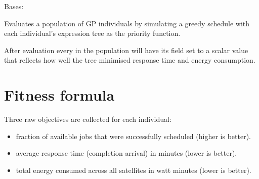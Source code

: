 \documentclass[letterpaper,10pt,english]{sphinxmanual}
\begin{document}

\begin{fulllineitems}
\label{\detokenize{api:scheduler.FitnessEvaluator}}
\pysigstartsignatures
\pysigline
{}
\pysigstopsignatures
\sphinxAtStartPar
Bases: 

\sphinxAtStartPar
Evaluates a population of GP individuals by simulating a greedy schedule
with each individual’s expression tree as the priority function.

\sphinxAtStartPar
After evaluation every {\hyperref[\detokenize{api:scheduler.Individual}]{}} in the population will have
its  field set to a scalar value that reflects how well the tree
minimised response time and energy consumption.


\section{Fitness formula}
\label{\detokenize{api:fitness-formula}}
\sphinxAtStartPar
Three raw objectives are collected for each individual:
\begin{itemize}
\item {} 
\sphinxAtStartPar
{}  \textendash{} fraction of available jobs that were successfully
scheduled (higher is better).

\item {} 
\sphinxAtStartPar
{}   \textendash{} average response time (completion \sphinxhyphen{} arrival) in minutes
(lower is better).

\item {} 
\sphinxAtStartPar
{}     \textendash{} total energy consumed across all satellites in watt\sphinxhyphen{}
minutes (lower is better).

\end{itemize}


\end{fulllineitems}
\end{document}
